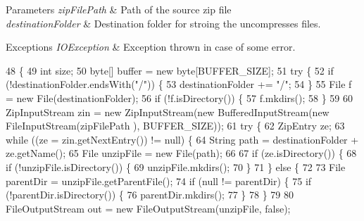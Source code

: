 \begin{DoxyParams}{Parameters}
{\em zip\-File\-Path} & Path of the source zip file \\
\hline
{\em destination\-Folder} & Destination folder for stroing the uncompresses files. \\
\hline
\end{DoxyParams}

\begin{DoxyExceptions}{Exceptions}
{\em I\-O\-Exception} & Exception thrown in case of some error. \\
\hline
\end{DoxyExceptions}

\begin{DoxyCode}
48                                                                                               \{
49         \textcolor{keywordtype}{int} size;
50         byte[] buffer = \textcolor{keyword}{new} byte[BUFFER\_SIZE];
51         \textcolor{keywordflow}{try} \{
52             \textcolor{keywordflow}{if} (!destinationFolder.endsWith(\textcolor{stringliteral}{"/"})) \{
53                 destinationFolder += \textcolor{stringliteral}{"/"};
54             \}
55             File f = \textcolor{keyword}{new} File(destinationFolder);
56             \textcolor{keywordflow}{if} (!f.isDirectory()) \{
57                 f.mkdirs();
58             \}
59 
60             ZipInputStream zin = \textcolor{keyword}{new} ZipInputStream(\textcolor{keyword}{new} BufferedInputStream(\textcolor{keyword}{new} FileInputStream(zipFilePath
      ), BUFFER\_SIZE));
61             \textcolor{keywordflow}{try} \{
62                 ZipEntry ze;
63                 \textcolor{keywordflow}{while} ((ze = zin.getNextEntry()) != null) \{
64                     String path = destinationFolder + ze.getName();
65                     File unzipFile = \textcolor{keyword}{new} File(path);
66 
67                     \textcolor{keywordflow}{if} (ze.isDirectory()) \{
68                         \textcolor{keywordflow}{if} (!unzipFile.isDirectory()) \{
69                             unzipFile.mkdirs();
70                         \}
71                     \} \textcolor{keywordflow}{else} \{
72 
73                         File parentDir = unzipFile.getParentFile();
74                         \textcolor{keywordflow}{if} (null != parentDir) \{
75                             \textcolor{keywordflow}{if} (!parentDir.isDirectory()) \{
76                                 parentDir.mkdirs();
77                             \}
78                         \}
79 
80                         FileOutputStream out = \textcolor{keyword}{new} FileOutputStream(unzipFile, \textcolor{keyword}{false});

\end{DoxyCode}
